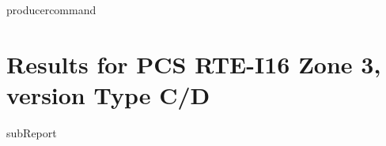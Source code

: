 {{ producercommand }}



    \section{Results for PCS RTE-I16 Zone 3, version Type C/D}

    {{subReport}}
    \newpage


